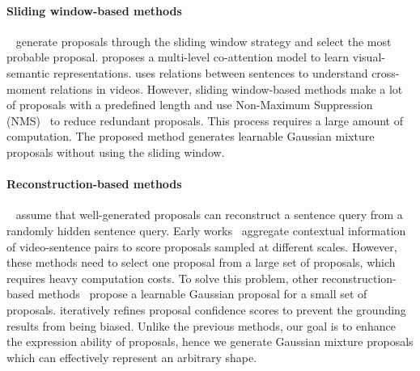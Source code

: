 \paragraph{Sliding window-based methods}~\cite{huang2021cross, tan2021logan, mithun2019weakly, wang2021weakly, zhang2020counterfactual} generate proposals through the sliding window strategy and select the most probable proposal.
\cite{tan2021logan} proposes a multi-level co-attention model to learn visual-semantic representations.
\cite{huang2021cross} uses relations between sentences to understand cross-moment relations in videos.
However, sliding window-based methods make a lot of proposals with a predefined length and use Non-Maximum Suppression (NMS)~\cite{neubeck2006efficient} to reduce redundant proposals.
This process requires a large amount of computation. 
The proposed method generates learnable Gaussian mixture proposals without using the sliding window.

\paragraph{Reconstruction-based methods}~\cite{lin2020weakly, zheng2022cnm, zheng2022cpl, song2020weakly, cao2023iterative} assume that well-generated proposals can reconstruct a sentence query from a randomly hidden sentence query.
Early works~\cite{lin2020weakly, song2020weakly} aggregate contextual information of video-sentence pairs to score proposals sampled at different scales.
However, these methods need to select one proposal from a large set of proposals, which requires heavy computation costs.
To solve this problem, other reconstruction-based methods~\cite{zheng2022cnm, zheng2022cpl} propose a learnable Gaussian proposal for a small set of proposals.
\cite{cao2023iterative} iteratively refines proposal confidence scores to prevent the grounding results from being biased.
Unlike the previous methods, our goal is to enhance the expression ability of proposals, hence we generate Gaussian mixture proposals which can effectively represent an arbitrary shape.


